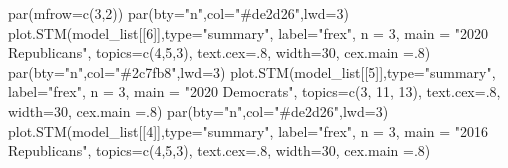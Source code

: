 \documentclass[
]{article}
\newenvironment{Shaded}{\begin{snugshade}}{\end{snugshade}}
\newcommand{\AttributeTok}[1]{\textcolor[rgb]{0.77,0.63,0.00}{#1}}
\newcommand{\DecValTok}[1]{\textcolor[rgb]{0.00,0.00,0.81}{#1}}
\newcommand{\FunctionTok}[1]{\textcolor[rgb]{0.00,0.00,0.00}{#1}}
\newcommand{\NormalTok}[1]{#1}
\newcommand{\StringTok}[1]{\textcolor[rgb]{0.31,0.60,0.02}{#1}}
\begin{document}
\begin{Shaded}
\begin{Highlighting}[]
\FunctionTok{par}\NormalTok{(}\AttributeTok{mfrow=}\FunctionTok{c}\NormalTok{(}\DecValTok{3}\NormalTok{,}\DecValTok{2}\NormalTok{))}
\FunctionTok{par}\NormalTok{(}\AttributeTok{bty=}\StringTok{"n"}\NormalTok{,}\AttributeTok{col=}\StringTok{"\#de2d26"}\NormalTok{,}\AttributeTok{lwd=}\DecValTok{3}\NormalTok{)}
\FunctionTok{plot.STM}\NormalTok{(model\_list[[}\DecValTok{6}\NormalTok{]],}\AttributeTok{type=}\StringTok{"summary"}\NormalTok{, }\AttributeTok{label=}\StringTok{"frex"}\NormalTok{, }\AttributeTok{n =} \DecValTok{3}\NormalTok{, }\AttributeTok{main =} \StringTok{"2020 Republicans"}\NormalTok{, }
     \AttributeTok{topics=}\FunctionTok{c}\NormalTok{(}\DecValTok{4}\NormalTok{,}\DecValTok{5}\NormalTok{,}\DecValTok{3}\NormalTok{), }\AttributeTok{text.cex=}\NormalTok{.}\DecValTok{8}\NormalTok{, }\AttributeTok{width=}\DecValTok{30}\NormalTok{, }\AttributeTok{cex.main =}\NormalTok{.}\DecValTok{8}\NormalTok{)}
\FunctionTok{par}\NormalTok{(}\AttributeTok{bty=}\StringTok{"n"}\NormalTok{,}\AttributeTok{col=}\StringTok{"\#2c7fb8"}\NormalTok{,}\AttributeTok{lwd=}\DecValTok{3}\NormalTok{)}
\FunctionTok{plot.STM}\NormalTok{(model\_list[[}\DecValTok{5}\NormalTok{]],}\AttributeTok{type=}\StringTok{"summary"}\NormalTok{, }\AttributeTok{label=}\StringTok{"frex"}\NormalTok{, }\AttributeTok{n =} \DecValTok{3}\NormalTok{, }\AttributeTok{main =} \StringTok{"2020 Democrats"}\NormalTok{, }
     \AttributeTok{topics=}\FunctionTok{c}\NormalTok{(}\DecValTok{3}\NormalTok{, }\DecValTok{11}\NormalTok{, }\DecValTok{13}\NormalTok{), }\AttributeTok{text.cex=}\NormalTok{.}\DecValTok{8}\NormalTok{, }\AttributeTok{width=}\DecValTok{30}\NormalTok{, }\AttributeTok{cex.main =}\NormalTok{.}\DecValTok{8}\NormalTok{)}
\FunctionTok{par}\NormalTok{(}\AttributeTok{bty=}\StringTok{"n"}\NormalTok{,}\AttributeTok{col=}\StringTok{"\#de2d26"}\NormalTok{,}\AttributeTok{lwd=}\DecValTok{3}\NormalTok{)}
\FunctionTok{plot.STM}\NormalTok{(model\_list[[}\DecValTok{4}\NormalTok{]],}\AttributeTok{type=}\StringTok{"summary"}\NormalTok{, }\AttributeTok{label=}\StringTok{"frex"}\NormalTok{, }\AttributeTok{n =} \DecValTok{3}\NormalTok{, }\AttributeTok{main =} \StringTok{"2016 Republicans"}\NormalTok{, }
     \AttributeTok{topics=}\FunctionTok{c}\NormalTok{(}\DecValTok{4}\NormalTok{,}\DecValTok{5}\NormalTok{,}\DecValTok{3}\NormalTok{), }\AttributeTok{text.cex=}\NormalTok{.}\DecValTok{8}\NormalTok{, }\AttributeTok{width=}\DecValTok{30}\NormalTok{, }\AttributeTok{cex.main =}\NormalTok{.}\DecValTok{8}\NormalTok{)}

\end{Highlighting}
\end{Shaded}
\end{document}
